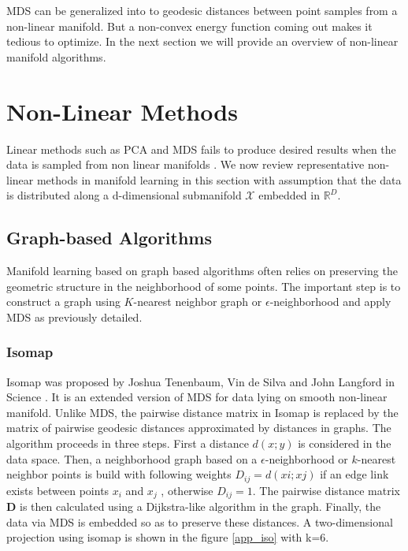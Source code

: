 MDS can be generalized into to geodesic distances between point samples from
a non-linear manifold. But a non-convex energy function coming out makes it  
tedious to optimize. In the next section we will provide an overview of non-linear manifold algorithms.


\section{Non-Linear Methods}

Linear methods such as PCA and MDS fails to produce desired results when the data is sampled from non linear manifolds \citep{Thor2009}. We now review representative non-linear methods in manifold learning in this section with assumption that the data is distributed along a d-dimensional submanifold $\mathcal{X}$ embedded in $\mathbb{R}^{D}$.

\subsection{Graph-based Algorithms}

Manifold learning based on graph based algorithms often relies on preserving the geometric structure in the neighborhood of some points. The important step is to construct a graph using $K$-nearest neighbor graph or $\epsilon$-neighborhood and apply MDS as previously detailed.

\subsubsection{Isomap}
\label{s:isomap}

Isomap was proposed by Joshua Tenenbaum, Vin de Silva and John Langford in Science \citep{Tene2000}. It is an extended version of MDS for data lying on smooth non-linear manifold. Unlike MDS, the pairwise distance matrix in Isomap is replaced by the matrix of pairwise geodesic distances approximated by distances in graphs. The algorithm proceeds in three steps. First a distance $d(x; y)$ is considered in the data space. Then, a neighborhood graph based on a $\epsilon$-neighborhood or $k$-nearest neighbor points is build with following weights $D_{ij} = d(xi; xj)$ if an edge link
exists between points $x_i$ and $x_j$ , otherwise $D_{ij} = 1$. The pairwise distance matrix $\mathbf{D}$ is then calculated using a Dijkstra-like algorithm in the graph. Finally, the data via MDS is embedded so as to preserve these distances. A two-dimensional projection using isomap is shown in the figure \ref{app_iso} with k=6.

